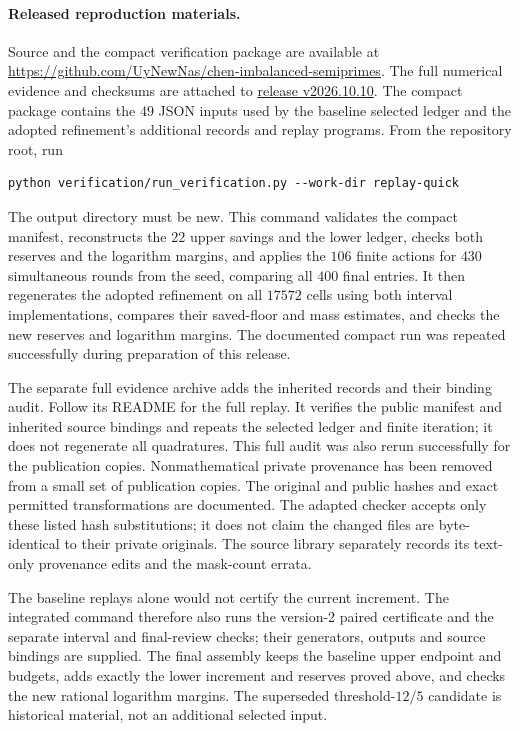 \paragraph{Released reproduction materials.}
Source and the compact verification package are available at
\url{https://github.com/UyNewNas/chen-imbalanced-semiprimes}.
The full numerical evidence and checksums are attached to
\href{https://github.com/UyNewNas/chen-imbalanced-semiprimes/releases/tag/v2026.10.10}{release v2026.10.10}.
The compact package contains the $49$ JSON inputs
used by the baseline selected ledger and the adopted refinement's
additional records and replay programs. From the repository root, run
\begin{verbatim}
python verification/run_verification.py --work-dir replay-quick
\end{verbatim}
The output directory must be new. This command validates the compact
manifest, reconstructs the $22$ upper savings and the lower ledger,
checks both reserves and the logarithm margins, and applies the $106$
finite actions for $430$ simultaneous rounds from the seed, comparing
all $400$ final entries. It then regenerates the adopted refinement on all
$17572$ cells using both interval implementations, compares their saved-floor
and mass estimates, and checks the new reserves and logarithm margins.
The documented compact run was repeated successfully during preparation
of this release.

The separate full evidence archive adds the inherited records and their
binding audit. Follow its README for the full replay. It verifies the
public manifest and inherited source bindings and repeats the selected
ledger and finite iteration; it does not regenerate all quadratures.
This full audit was also rerun successfully for the publication copies.
Nonmathematical private provenance has been removed from a small set of
publication copies. The original and public hashes and exact permitted
transformations are documented. The adapted checker accepts only these
listed hash substitutions; it does not claim the changed files are
byte-identical to their private originals. The source library separately
records its text-only provenance edits and the mask-count errata.

The baseline replays alone would not certify the current increment.
The integrated command therefore also runs the version-2 paired
certificate and the separate interval and final-review checks; their
generators, outputs and source bindings are supplied. The final assembly keeps
the baseline upper endpoint and budgets, adds exactly the lower
increment and reserves proved above, and checks the new rational
logarithm margins.  The superseded threshold-$12/5$ candidate is
historical material, not an additional selected input.

